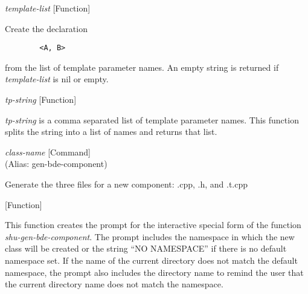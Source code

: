 \vspace{1em}
\noindent
{}
\usebox{\funcname}\emph{template-list}
 \hfill [Function]

\begin{doc-string}
Create the declaration

\small{\begin{verbatim}
        <A, B>
\end{verbatim}}

from the list of template parameter names.
An empty string is returned if \emph{template-list} is nil or empty.
\end{doc-string}

\vspace{1em}
\noindent
{}
\usebox{\funcname}\emph{tp-string}
 \hfill [Function]

\begin{doc-string}
\emph{tp-string} is a comma separated list of template parameter names.  This
function splits the string into a list of names and returns that list.
\end{doc-string}

\vspace{1em}
\noindent
{}
\usebox{\funcname}\emph{class-name}
 \hfill [Command]\\%
 (Alias: gen-bde-component)

\begin{doc-string}
Generate the three files for a new component: .cpp, .h, and .t.cpp
\end{doc-string}

\vspace{1em}
\noindent
{}
\usebox{\funcname}
 \hfill [Function]

\begin{doc-string}
This function creates the prompt for the interactive special form of the
function \emph{shu-gen-bde-component}.  The prompt includes the namespace in which the
new class will be created or the string ``NO NAMESPACE'' if there is no default
namespace set.  If the name of the current directory does not match the default
namespace, the prompt also includes the directory name to remind the user that
the current directory name does not match the namespace.
\end{doc-string}

